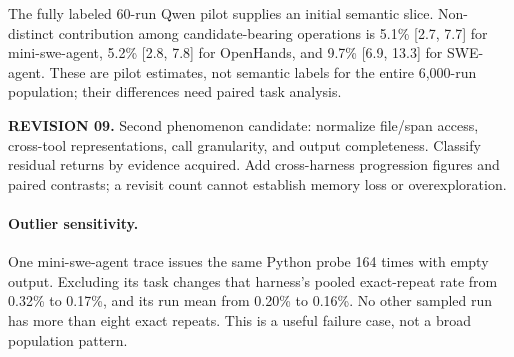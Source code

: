 \documentclass[10pt,a4paper,twocolumn]{article}
\newcommand{\rev}[2]{\par\smallskip\noindent\begin{minipage}{\linewidth}\color{revision}\footnotesize\textbf{REVISION #1.} #2\end{minipage}\par\smallskip}
\begin{document}
The fully labeled 60-run Qwen pilot supplies an initial semantic slice. Non-distinct contribution among candidate-bearing operations is 5.1\% [2.7, 7.7] for mini-swe-agent, 5.2\% [2.8, 7.8] for OpenHands, and 9.7\% [6.9, 13.3] for SWE-agent. These are pilot estimates, not semantic labels for the entire 6,000-run population; their differences need paired task analysis.
\rev{09}{Second phenomenon candidate: normalize file/span access, cross-tool representations, call granularity, and output completeness. Classify residual returns by evidence acquired. Add cross-harness progression figures and paired contrasts; a revisit count cannot establish memory loss or overexploration.}

\paragraph{Outlier sensitivity.}
One mini-swe-agent trace issues the same Python probe 164 times with empty output. Excluding its task changes that harness's pooled exact-repeat rate from 0.32\% to 0.17\%, and its run mean from 0.20\% to 0.16\%. No other sampled run has more than eight exact repeats. This is a useful failure case, not a broad population pattern.
\end{document}
